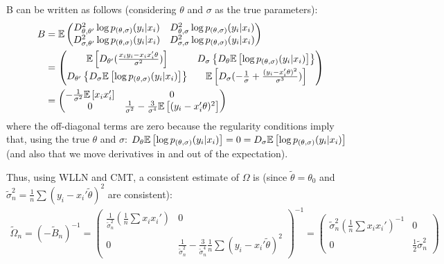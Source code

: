 \documentclass[12pt]{paper}
\begin{document}
B can be written as follows (considering $\theta$ and $\sigma$ as the true parameters):
\begin{align*}
B&=
\mathbb{E}\begin{pmatrix}
D^2_{\theta,\theta'}\log{p_{(\theta,\sigma)}}(y_i|x_i) & D^2_{\theta,\sigma}\log{p_{(\theta,\sigma)}}(y_i|x_i)\\
D^2_{\sigma,\theta'}\log{p_{(\theta,\sigma)}}(y_i|x_i) & D^2_{\sigma,\sigma}\log{p_{(\theta,\sigma)}}(y_i|x_i)
\end{pmatrix}\\
&=\begin{pmatrix}
\mathbb{E} \left [ D_{\theta'}(\frac{x_iy_i-x_ix_i'\theta}{\sigma^2}) \right ] & D_{\sigma}\left\{D_{\theta}\mathbb{E} \left [ \log{p_{(\theta,\sigma)}}(y_i|x_i) \right ]\right\}\\
D_{\theta'}\left\{D_{\sigma}\mathbb{E} \left [ \log{p_{(\theta,\sigma)}}(y_i|x_i) \right ]\right\}&\mathbb{E} \left [  D_{\sigma}(-\frac{1}{\sigma}+\frac{(y_i-x_i'\theta)^2}{\sigma^3}) \right ]
\end{pmatrix}\\
&=\begin{pmatrix}
-\frac{1}{\sigma^2}\mathbb{E} \left [ x_ix_i' \right ] & 0\\
0 & \frac{1}{\sigma^2}-\frac{3}{\sigma^4}\mathbb{E} \left [ (y_i-x_i'\theta)^2 \right ]
\end{pmatrix}
\end{align*}
\noindent where the off-diagonal terms are zero because the regularity conditions imply that, using the true $\theta$ and $\sigma$: $D_{\theta}\mathbb{E} \left [ \log{p_{(\theta,\sigma)}}(y_i|x_i) \right ]=0=D_{\sigma}\mathbb{E} \left [ \log{p_{(\theta,\sigma)}}(y_i|x_i) \right ]$ (and also that we move derivatives in and out of the expectation).

Thus, using WLLN and CMT, a consistent estimate of $\Omega$ is (since $\tilde{\theta}=\theta_0$ and $\tilde{\sigma}_n^2=\frac{1}{n}\sum{(y_i-x_i'\tilde{\theta})^2}$ are consistent):
\begin{align*}
\tilde{\Omega}_n=(-\tilde{B}_n)^{-1}=\begin{pmatrix}
\frac{1}{\tilde{\sigma}_n^2}\left(\frac{1}{n}\sum{x_ix_i'}\right) & 0\\
0 & \frac{1}{\tilde{\sigma}_n^2}-\frac{3}{\tilde{\sigma}_n^4}\frac{1}{n}\sum{(y_i-x_i'\tilde{\theta})^2}
\end{pmatrix}^{-1}=\begin{pmatrix}
\tilde{\sigma}_n^2\left(\frac{1}{n}\sum{x_ix_i'}\right)^{-1} & 0\\
0 & \frac{1}{2}\tilde{\sigma}_n^2
\end{pmatrix}
\end{align*}
\end{document}
